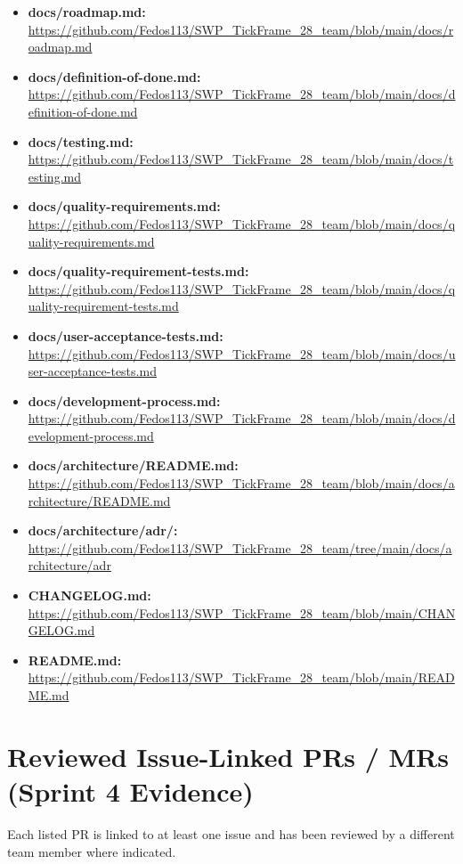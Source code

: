\documentclass[11pt,a4paper]{article}
\begin{document}
\begin{itemize}[leftmargin=*]
    \item \textbf{docs/roadmap.md:} \url{https://github.com/Fedos113/SWP_TickFrame_28_team/blob/main/docs/roadmap.md}
    \item \textbf{docs/definition-of-done.md:} \url{https://github.com/Fedos113/SWP_TickFrame_28_team/blob/main/docs/definition-of-done.md}
    \item \textbf{docs/testing.md:} \url{https://github.com/Fedos113/SWP_TickFrame_28_team/blob/main/docs/testing.md}
    \item \textbf{docs/quality-requirements.md:} \url{https://github.com/Fedos113/SWP_TickFrame_28_team/blob/main/docs/quality-requirements.md}
    \item \textbf{docs/quality-requirement-tests.md:} \url{https://github.com/Fedos113/SWP_TickFrame_28_team/blob/main/docs/quality-requirement-tests.md}
    \item \textbf{docs/user-acceptance-tests.md:} \url{https://github.com/Fedos113/SWP_TickFrame_28_team/blob/main/docs/user-acceptance-tests.md}
    \item \textbf{docs/development-process.md:} \url{https://github.com/Fedos113/SWP_TickFrame_28_team/blob/main/docs/development-process.md}
    \item \textbf{docs/architecture/README.md:} \url{https://github.com/Fedos113/SWP_TickFrame_28_team/blob/main/docs/architecture/README.md}
    \item \textbf{docs/architecture/adr/:} \url{https://github.com/Fedos113/SWP_TickFrame_28_team/tree/main/docs/architecture/adr}
    \item \textbf{CHANGELOG.md:} \url{https://github.com/Fedos113/SWP_TickFrame_28_team/blob/main/CHANGELOG.md}
    \item \textbf{README.md:} \url{https://github.com/Fedos113/SWP_TickFrame_28_team/blob/main/README.md}
\end{itemize}

\section{Reviewed Issue-Linked PRs / MRs (Sprint 4 Evidence)}

Each listed PR is linked to at least one issue and has been reviewed by a different team member where indicated.
\end{document}

